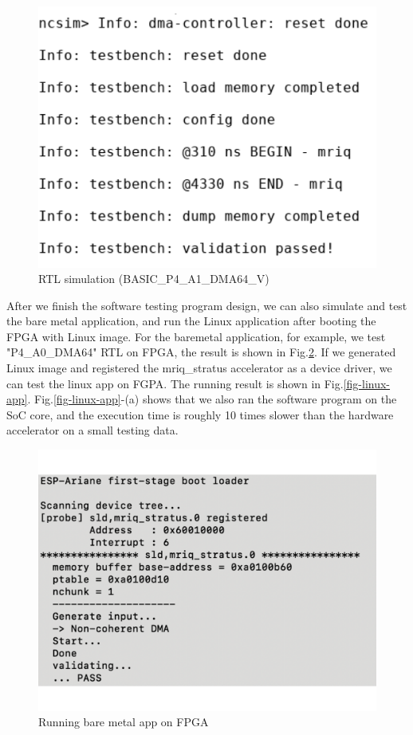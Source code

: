 \begin{figure}[ht]
\centering
\captionsetup{justification=centering, format=hang}
\includegraphics[width=0.75\columnwidth]{figures/debug-sim-A1-4-4-2-2}
\caption{RTL simulation (BASIC\_P4\_A1\_DMA64\_V)}
\label{fig-3}
\end{figure}

After we finish the software testing program design, we can also simulate and
test the bare metal application, and run the Linux application after booting the
FPGA with Linux image. For the baremetal application, for example, we test
"P4\_A0\_DMA64" RTL on FPGA, the result is shown in Fig.\ref{fig-barec-app}. If
we generated Linux image and registered the mriq\_stratus accelerator as a
device driver, we can test the linux app on FGPA. The running result is shown in
Fig.\ref{fig-linux-app}. Fig.\ref{fig-linux-app}-(a) shows that we also ran the
software program on the SoC core, and the execution time is roughly 10 times
slower than the hardware accelerator on a small testing data.

\begin{figure}[t]
\centering
\captionsetup{justification=centering, format=hang}
\includegraphics[width=0.85\columnwidth]{figures/barec-fpga}
\caption{Running bare metal app on FPGA}
\label{fig-barec-app}
\end{figure}

